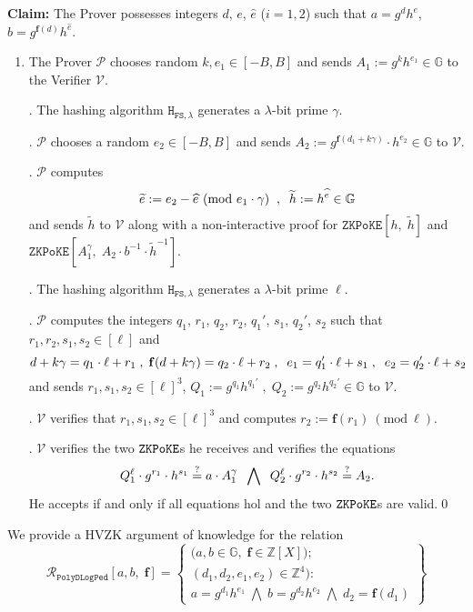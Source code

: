 \documentclass[11pt, lettersize, notitlepage, leqno, footskip=0.6cm]{article}
\newcommand{\bz}{\mathbb Z}
\newcommand{\ttt}{\texttt}
\newcommand{\bG}{\mathbb{G}}
\newcommand{\wti}{\widetilde}
\newcommand{\mc}{\mathcal}
\newcommand{\mb}{\mathbb}
\newcommand{\mbf}{\mathbf}
\newcommand{\lam}{\lambda}
\newcommand{\what}{\widehat}
\newcommand{\mP}{\mc{P}}
\newcommand{\V}{\mc{V}}
\newcommand{\vs}{\vspace{-0.15cm}}
\newcommand{\noin}{\noindent}
\newcommand{\sta}{\stackrel{?}{=}}
\newcommand{\Mod}[1]{\ (\mathrm{mod}\ #1)}
\numberwithin{equation}{section}
\begin{document}
{{{\noin \textbf{Claim:} The Prover possesses integers $d$, $e$, $\what{e}$ ($i=1,2$) such that $a = g^dh^e$, $b = g^{\mbf{f}(d)}h^{\what{e}}$.

\begin{enumerate}[wide, labelwidth=!, labelindent=0pt]\vs \item The Prover $\mP$ chooses random $k, e_1\in[-B,B]$ and sends $A_1:= g^{k}h^{e_1}\in \bG$ to the Verifier $\V$.

\noin 2. The hashing algorithm $\ttt{H}_{\ttt{FS},\lam}$ generates a $\lam$-bit prime $\gamma$.

\noin 3. $\mP$ chooses a random $e_2 \in [-B,B]$ and sends $A_2:= g^{\mbf{f}(d_1+k\gamma)}\cdot h^{e_2}\in \bG$ to $\V$.

\noin 4. $\mP$ computes \vs $$\wti{e}:= e_2-\what{e}\Mod{e_1\cdot \gamma}\;\;,\;\;\wti{h}:= h^{\what{e}}\in \bG\vs $$ and sends $\wti{h}$ to $\V$ along with a non-interactive proof for $\ttt{ZKPoKE}[h,\; \wti{h}]$ and $\ttt{ZKPoKE}[A_1^{\gamma},\;A_2\cdot b^{-1}\cdot \wti{h}^{-1}] $.

\noin 5. The hashing algorithm $\ttt{H}_{\ttt{FS},\lam}$ generates a $\lam$-bit prime $\ell$. 

\noin 6. $\mP$ computes the integers $q_1$, $r_1$, $q_2$, $r_2$, $q_1'$, $s_1$, $q_2'$, $s_2$ such that $r_1,r_2,s_1,s_2\in [\ell]$ and \vs $$d+k\gamma = q_1\cdot \ell + r_1\;,\; \mbf{f}(d+k\gamma) = q_2\cdot \ell + r_2 \;,\;\;e_1 = q_1'\cdot \ell+s_1 \;,\;\;e_2 = q_2'\cdot \ell+s_2 \vs $$ and sends $r_1 ,s_1, s_2\in [\ell]^3$, $Q_1:= g^{q_1}h^{q_1'}\;,\; Q_2:= g^{q_2}h^{q_2'}\in \bG$ to $\V$.

\noin 7. $\V$ verifies that $r_1 ,s_1, s_2\in [\ell]^3$ and computes $r_2:= \mbf{f}(r_1)\Mod{\ell}$.

\noin 8. $\V$ verifies the two $\tt{ZKPoKE}$s he receives and verifies the equations \vs $$ Q_1^{\ell}\cdot g^{r_1}\cdot h^{s_1}\sta a\cdot A_1^{\gamma} \;\;\bigwedge\;\; Q_2^{\ell}\cdot g^{r_2}\cdot h^{s_2}\sta    A_2 .\vs $$ He accepts if and only if all equations hol and the two $\tt{ZKPoKE}$s are valid.\qed\end{enumerate}


We provide a HVZK argument of knowledge for the relation \[
  \mc{R}_{{\ttt{PolyDLogPed}}}[a,b,\;\mbf{f}] = \left\{\begin{array}{l}
    \big(a,b\in\mb{G},\;\mbf{f}\in\bz[X]\big);\\
    (d_1, d_2, e_1,e_2)\in\mb{Z}^4): \\
    a = g^{d_1}h^{e_1}\; \bigwedge\; b = g^{d_2}h^{e_2}\; \bigwedge \;d_2 = \mbf{f}(d_1)
  \end{array}\right\}
\] 





}}}
\end{document}
